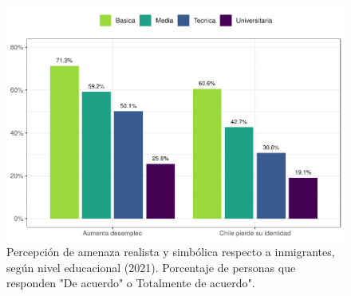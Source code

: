 \documentclass[
  12pt,
]{book}
\begin{document}
\begin{figure}

{\centering \includegraphics{reporte-elsoc_files/figure-latex/amen-educ-1} 

}

\caption{Percepción de amenaza realista y simbólica respecto a inmigrantes, según nivel educacional (2021). Porcentaje de personas que responden "De acuerdo" o Totalmente de acuerdo".}\label{fig:amen-educ}
\end{figure}
\end{document}
